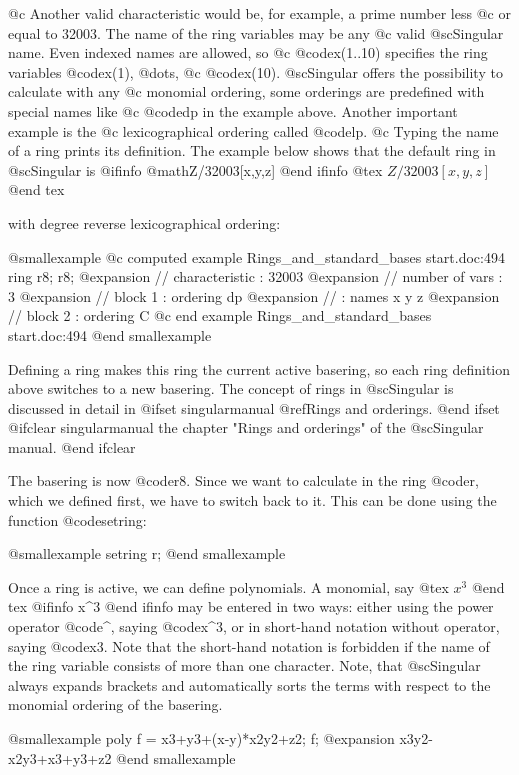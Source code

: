 @c Another valid characteristic would be, for example, a prime number less
@c or equal to 32003. The name of the ring variables may be any
@c valid @sc{Singular} name. Even indexed names are allowed, so
@c @code{x(1..10)} specifies the ring variables @code{x(1)}, @dots{},
@c @code{x(10)}. @sc{Singular} offers the possibility to calculate with any
@c monomial ordering, some orderings are predefined with special names like
@c @code{dp} in the example above. Another important example is the
@c lexicographical ordering called @code{lp}.
@c
Typing the name of a ring prints its definition. The example below
shows that the default ring in @sc{Singular} is 
@ifinfo
@math{Z/32003[x,y,z]}
@end ifinfo
@tex
$Z/32003[x,y,z]$
@end tex

with degree reverse lexicographical ordering:

@smallexample
@c computed example Rings_and_standard_bases start.doc:494 
ring r8;
r8;
@expansion{} //   characteristic : 32003
@expansion{} //   number of vars : 3
@expansion{} //        block   1 : ordering dp
@expansion{} //                  : names    x y z 
@expansion{} //        block   2 : ordering C
@c end example Rings_and_standard_bases start.doc:494
@end smallexample

Defining a ring makes this ring the current active basering, so each
ring definition above switches to a new basering. The concept of rings
in @sc{Singular} is discussed in detail in
@ifset singularmanual
@ref{Rings and orderings}.
@end ifset
@ifclear singularmanual
the chapter "Rings and orderings" of the @sc{Singular} manual.
@end ifclear

The basering is now @code{r8}. Since we want to calculate in the ring
@code{r}, which we defined first, we have to switch back to it. This can
be done using the function @code{setring}:

@smallexample
setring r;
@end smallexample

Once a ring is active, we can define polynomials. A monomial, say
@tex
$x^3$
@end tex
@ifinfo
x^3
@end ifinfo
may be entered in two ways: either using the power operator @code{^},
saying @code{x^3}, or in short-hand notation without operator, saying
@code{x3}. Note that the short-hand notation is forbidden if the name
of the ring variable consists of more than one character. Note, that
@sc{Singular} always expands brackets and automatically sorts the terms
with respect to the monomial ordering of the basering.

@smallexample
poly f =  x3+y3+(x-y)*x2y2+z2;
f;
@expansion{} x3y2-x2y3+x3+y3+z2
@end smallexample


